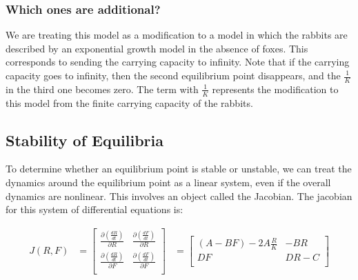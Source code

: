 \documentclass{article}
\begin{document}
\paragraph{}


\subsubsection{Which ones are additional?}

We are treating this model as a modification to a model
	in which the rabbits are described by an exponential
	growth model in the absence of foxes.
This corresponds to sending the carrying capacity to infinity.
Note that if the carrying capacity goes to infinity,
	then the second equilibrium point disappears,
	and the $\frac{1}{K}$ in the third one becomes zero.
The term with $\frac{1}{K}$ represents the modification to this
	model from the finite carrying capacity of the rabbits.

\subsection{Stability of Equilibria}

To determine whether an equilibrium point is stable or unstable,
	we can treat the dynamics around the equilibrium point
	as a linear system, even if the overall dynamics are nonlinear.
This involves an object called the Jacobian.
The jacobian for this system of differential equations is:

\begin{align}
	J(R,F) & = \left[ 
		\begin{array}{cc} 
			\frac{\partial \left(\frac{dR}{dt}\right)}
				{\partial R}
		& 
			\frac{\partial \left(\frac{dF}{dt}\right)}
				{\partial R}
		\\
			\frac{\partial \left(\frac{dR}{dt}\right)}
				{\partial F}
		&
			\frac{\partial \left(\frac{dF}{dt}\right)}
				{\partial F}
		\\
		\end{array} \right]
	& = \left[ \begin{array}{cc}
			\left( A - B F \right) - 2 A \frac{R}{K}
		&
			- B R
		\\
			D F
		&
			D R - C
		\\
		\end{array} \right]
\end{align}
\end{document}
